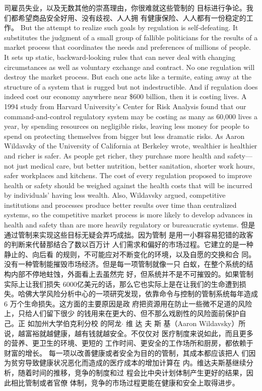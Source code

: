 \begin{paracol}{2}
司雇员失业，以及无数其他的崇髙理由，你很难就这些管制的
目标进行争论。我们都希望商品安全好用、没有歧视、人人拥
有健康保险、人人都有一份稳定的工作。
\switchcolumn*
But the attempt to realize such goals by regulation is self-defeating. It substitutes the judgment of a small group of fallible
politicians for the results of a market process that coordinates
the needs and preferences of millions of people. It sets up static,
backward-looking rules that can never deal with changing circumstances as well as voluntary exchange and contract. No one
regulation will destroy the market process. But each one acts
like a termite, eating away at the structure of a system that is
rugged but not indestructible. And if regulation does indeed
cost our economy anywhere near \$600 billion, then it is costing
lives. A 1994 study from Harvard University's Center for Risk
Analysis found that our command-and-control regulatory system may be costing as many as 60,000 lives a year, by spending
resources on negligible risks, leaving less money for people to
spend on protecting themselves from bigger but less dramatic
risks. As Aaron Wildavsky of the University of California at
Berkeley wrote, wealthier is healthier and richer is safer. As people get richer, they purchase more health and safety---not just
medical care, but better nutrition, better sanitation, shorter
work hours, safer workplaces and kitchens. The cost of every regulation proposed to improve health or safety should be
weighed against the health costs that will be incurred by individuals' having less wealth. Also, Wildavsky argued, competitive institutions and processes produce better results over time
than centralized systems, so the competitive market process is
more likely to develop advances in health and safety than are
more heavily regulatory or bureaucratic systems.
\switchcolumn
但是通过管制来实现这些目标无疑会弄巧成拙。因为管制
是用一小群容易犯错的政客的判断来代替那结合了数以百万计
人们需求和偏好的市场过程。它建立的是一种静止的、向后看
的规则，不可能应对不断变化的环境，以及自愿的交换和合
同。没有一种管制能摧毁市场经济。但是每一项管制就像一只
白蚁，在整个系统的结构内部不停地蛀蚀，外面看上去虽然完
好，但系统并不是不可摧毁的。如果管制实际上让我们损失
6000亿美元的话，那么它也实际上是在让我们的生命遭到损
失。哈佛大学风险分析中心的一项研究发现，依靠命令与控制的管制系统每年造成6 万个生命损失。这方面的主要原因是政
府把资源用在防止一些微不足道的风险上，只给人们留下很少
的钱用来在更大的、但不那么戏剧性的风险面前保护自己。正
如加州大学伯克利分校 的阿龙$\cdot$ 维 达 夫 斯 基（Aaron  Wildavsky）所说，越富裕就越健康，越有钱就越安全。不仅仅对
医疗制度来说如此，而且更多的营养、更卫生的环境、更短的
工作时间、更安全的工作场所和厨房，都依赖于财富的增长。
每一项以改善健康或者安全为目的的管制，其成本都应该把人
们因为贫穷导致健康状况恶化而造成的医疗成本的增加计算在
内。维达夫斯基继续分析，随着时间的推移，竞争的制度和过
程会比中央计划体制产生更好的结果，因此相比管制或者官僚
体制，竞争的市场过程更能在健康和安全上取得进步。


\end{paracol}
